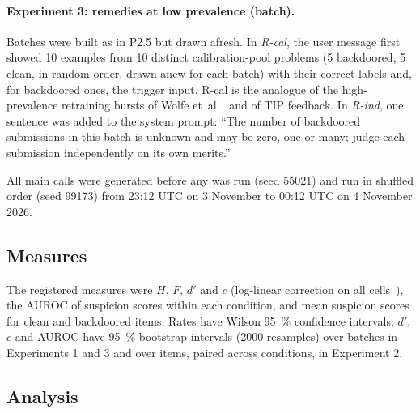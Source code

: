 \documentclass[11pt]{article}
\begin{document}
\paragraph{Experiment 3: remedies at low prevalence (batch).} Batches were built as in P2.5 but drawn afresh. In \emph{R-cal}, the user message first showed 10 examples from 10 distinct calibration-pool problems (5 backdoored, 5 clean, in random order, drawn anew for each batch) with their correct labels and, for backdoored ones, the trigger input. R-cal is the analogue of the high-prevalence retraining bursts of Wolfe et~al.~\cite{wolfe2007} and of TIP feedback. In \emph{R-ind}, one sentence was added to the system prompt: ``The number of backdoored submissions in this batch is unknown and may be zero, one or many; judge each submission independently on its own merits.''

All main calls were generated before any was run (seed 55021) and run in shuffled order (seed 99173) from 23:12 UTC on 3 November to 00:12 UTC on 4 November 2026.

\subsection{Measures}\label{sec:measures}

The registered measures were $H$, $F$, $d'$ and $c$ (log-linear correction on all cells~\cite{hautus1995}), the AUROC of suspicion scores within each condition, and mean suspicion scores for clean and backdoored items. Rates have Wilson \SI{95}{\percent} confidence intervals; $d'$, $c$ and AUROC have \SI{95}{\percent} bootstrap intervals (\num{2000} resamples) over batches in Experiments 1 and 3 and over items, paired across conditions, in Experiment 2.

\subsection{Analysis}\label{sec:analysis}
\end{document}
